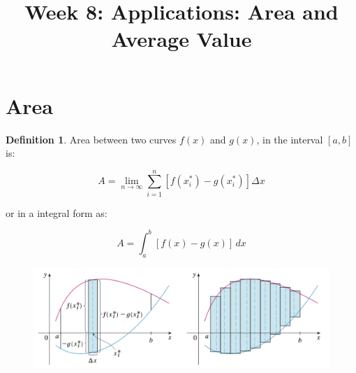 \documentclass[t]{beamer}
\title{Week 8: Applications: Area and Average Value}
\theoremstyle{plain}
\theoremstyle{definition}
\newtheorem{dfn}{Definition}
\begin{document}
\frame{\titlepage}

\setcounter{tocdepth}{2}
\frame{\tableofcontents

\begin{flushright}
\end{flushright} 
}


\section{Area}

\begin{frame}
\footnotesize
\begin{dfn} 
Area between two curves $f(x)$ and $g(x)$, in the interval $[a, b]$ is:

$$ A = \lim_{n\rightarrow \infty} \sum_{i=1}^{n} \left[ f(x_i^{*}) - g(x_i^{*})  \right] \Delta{x}$$

or in a integral form as:

$$ A = \int_{a}^{b} \left[ f(x) - g(x) \right] \, dx $$
\end{dfn}

\begin{figure}[t]
\begin{center}
\includegraphics[scale=0.4]{fig/area}
\end{center}
\end{figure}

\end{frame}
\end{document}
